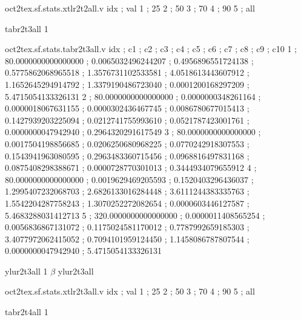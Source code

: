 \begin{filecontents}[overwrite]{oct2tex.sf.stats.xtlr2t2all.v}
idx ; val
1 ; 25
2 ; 50
3 ; 70
4 ; 90
5 ; all
\end{filecontents}
\expandafter\def\csname oct2tex.sf.stats.tabr2t3all.t\endcsname{tabr2t3all}
\expandafter\def\csname oct2tex.sf.stats.tabr2t3all.u\endcsname{1}
\begin{filecontents}[overwrite]{oct2tex.sf.stats.tabr2t3all.v}
idx ; c1 ; c2 ; c3 ; c4 ; c5 ; c6 ; c7 ; c8 ; c9 ; c10
1 ; 80.0000000000000000 ; 0.0065032496244207 ; 0.4956896551724138 ; 0.5775862068965518 ; 1.3576731102533581 ; 4.0518613443607912 ; 1.1652645294914792 ; 1.3379190486723040 ; 0.0001200168297209 ; 5.4715054133326131
2 ; 80.0000000000000000 ; 0.0000000348261164 ; 0.0000018067631155 ; 0.0000302436467745 ; 0.0086780677015413 ; 0.1427939203225094 ; 0.0212741755993610 ; 0.0521787423001761 ; 0.0000000047942940 ; 0.2964320291617549
3 ; 80.0000000000000000 ; 0.0017504198856685 ; 0.0206250680968225 ; 0.0770242918307553 ; 0.1543941963080595 ; 0.2963483360715456 ; 0.0968816497831168 ; 0.0875408298388671 ; 0.0000728770301013 ; 0.3444934079655912
4 ; 80.0000000000000000 ; 0.0019629469205593 ; 0.1520403296436037 ; 1.2995407232068703 ; 2.6826133016284448 ; 3.6111244383335763 ; 1.5542204287758243 ; 1.3070252272082654 ; 0.0000603446127587 ; 5.4683288031412713
5 ; 320.0000000000000000 ; 0.0000011408565254 ; 0.0056836867131072 ; 0.1175024581170012 ; 0.7787992659185303 ; 3.4077972062415052 ; 0.7094101959124450 ; 1.1458086787807544 ; 0.0000000047942940 ; 5.4715054133326131
\end{filecontents}
\expandafter\def\csname oct2tex.sf.stats.ylur2t3all.t\endcsname{ylur2t3all}
\expandafter\def\csname oct2tex.sf.stats.ylur2t3all.u\endcsname{1}
\expandafter\def\csname oct2tex.sf.stats.ylur2t3all.v\endcsname{$\beta$}
\expandafter\def\csname oct2tex.sf.stats.xtlr2t3all.t\endcsname{ylur2t3all}
\begin{filecontents}[overwrite]{oct2tex.sf.stats.xtlr2t3all.v}
idx ; val
1 ; 25
2 ; 50
3 ; 70
4 ; 90
5 ; all
\end{filecontents}
\expandafter\def\csname oct2tex.sf.stats.tabr2t4all.t\endcsname{tabr2t4all}
\expandafter\def\csname oct2tex.sf.stats.tabr2t4all.u\endcsname{1}
